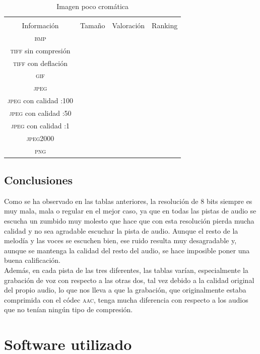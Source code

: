 \documentclass[11pt,a4paper]{article}
\begin{document}
\begin{table}[H]
\centering
\begin{tabular}{|c|c|c|c|}
\hline
\diagbox[width=15em]{\textit{Códec}/Formato}{\\Información} & Tamaño & Valoración & Ranking \\
\hline
\textsc{bmp} &  &  &  \\ \hline
\textsc{tiff} sin compresión &  &  &  \\ \hline
\textsc{tiff} con deflación &  &  &  \\ \hline
\textsc{gif} &  &  &  \\ \hline
\textsc{jpeg} &  &  &  \\ \hline
\textsc{jpeg} con calidad :100 &  &  &  \\ \hline
\textsc{jpeg} con calidad :50 &  &  &  \\ \hline
\textsc{jpeg} con calidad :1 &  &  &  \\ \hline
\textsc{jpeg2000} &  &  &  \\ \hline
\textsc{png} &  &  &  \\ \hline
\end{tabular}
\caption{Imagen poco cromática}
\label{tab:my-table}
\end{table}


\subsection{Conclusiones}

Como se ha observado en las tablas anteriores, la resolución de 8 bits siempre es muy mala, mala o regular en el mejor caso, ya que en todas las pistas de audio se escucha un zumbido muy molesto que hace que con esta resolución pierda mucha calidad y no sea agradable escuchar la pista de audio. Aunque el resto de la melodía y las voces se escuchen bien, ese ruido resulta muy desagradable y, aunque se mantenga la calidad del resto del audio, se hace imposible poner una buena calificación.\\

Además, en cada pista de las tres diferentes, las tablas varían, especialmente la grabación de voz con respecto a las otras dos, tal vez debido a la calidad original del propio audio, lo que nos lleva a que la grabación, que originalmente estaba comprimida con el códec \textsc{aac}, tenga mucha diferencia con respecto a los audios que no tenían ningún tipo de compresión.


\section{Software utilizado}
\end{document}
